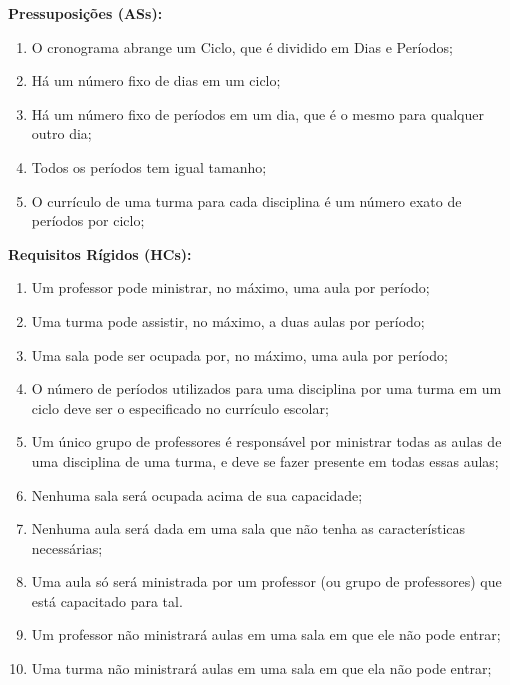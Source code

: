 \documentclass[12pt,a4paper]{article}
\begin{document}
			\textbf{Pressuposições (ASs):}
			\begin{enumerate}
				\item O cronograma abrange um Ciclo, que é dividido em Dias e Períodos;
				\item Há um número fixo de dias em um ciclo;
				\item Há um número fixo de períodos em um dia, que é o mesmo para qualquer outro dia;
				\item Todos os períodos tem igual tamanho;
				\item O currículo de uma turma para cada disciplina é um número exato de períodos por ciclo;
			\end{enumerate}

			\textbf{Requisitos Rígidos (HCs):}
			\begin{enumerate}
				\item Um professor pode ministrar, no máximo, uma aula por período;
				\item Uma turma pode assistir, no máximo, a duas aulas por período;
				\item Uma sala pode ser ocupada por, no máximo, uma aula por período;
				\item O número de períodos utilizados para uma disciplina por uma turma em um ciclo deve ser o especificado no currículo escolar;
				\item Um único grupo de professores é responsável por ministrar todas as aulas de uma disciplina de uma turma, e deve se fazer presente em todas essas aulas;
				\item Nenhuma sala será ocupada acima de sua capacidade;
				\item Nenhuma aula será dada em uma sala que não tenha as características necessárias;
				\item Uma aula só será ministrada por um professor (ou grupo de professores) que está capacitado para tal.
				\item Um professor não ministrará aulas em uma sala em que ele não pode entrar;
				\item Uma turma não ministrará aulas em uma sala em que ela não pode entrar;
			\end{enumerate}
\end{document}
